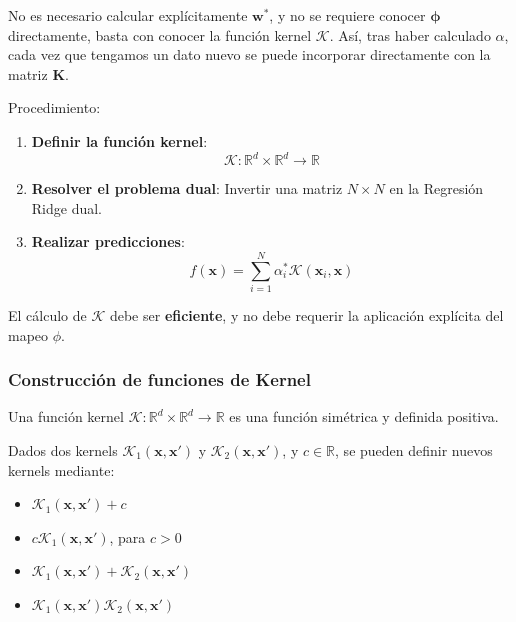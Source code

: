 No es necesario calcular explícitamente $\mathbf{w}^*$, y no se requiere conocer $\boldsymbol{\phi}$ directamente, basta con conocer la función kernel $\mathcal{K}$. Así, tras haber calculado $\alpha$, cada vez que tengamos un dato nuevo se puede incorporar directamente con la matriz \textbf{K}.

Procedimiento:
\begin{enumerate}
    \item \textbf{Definir la función kernel}:
    $$\mathcal{K} : \mathbb{R}^d \times \mathbb{R}^d \to \mathbb{R}$$
    
    \item \textbf{Resolver el problema dual}:
    Invertir una matriz $N \times N$ en la Regresión Ridge dual.
    
    \item \textbf{Realizar predicciones}:
    $$f(\mathbf{x}) = \sum_{i=1}^{N} \alpha_i^* \mathcal{K}(\mathbf{x}_i, \mathbf{x})$$
    \end{enumerate}

El cálculo de $\mathcal{K}$ debe ser \textbf{eficiente}, y no debe requerir la aplicación explícita del mapeo $\phi$.

\subsubsection{Construcción de funciones de Kernel}
Una función kernel $\mathcal{K} : \mathbb{R}^d \times \mathbb{R}^d \to \mathbb{R}$ es una función simétrica y definida positiva.

Dados dos kernels $\mathcal{K}_1(\mathbf{x}, \mathbf{x}')$ y $\mathcal{K}_2(\mathbf{x}, \mathbf{x}')$, y $c \in \mathbb{R}$, se pueden definir nuevos kernels mediante:
\begin{itemize}
    \item $\mathcal{K}_1(\mathbf{x}, \mathbf{x}') + c$
    \item $c\mathcal{K}_1(\mathbf{x}, \mathbf{x}')$, para $c > 0$
    \item $\mathcal{K}_1(\mathbf{x}, \mathbf{x}') + \mathcal{K}_2(\mathbf{x}, \mathbf{x}')$
    \item $\mathcal{K}_1(\mathbf{x}, \mathbf{x}')\mathcal{K}_2(\mathbf{x}, \mathbf{x}')$
\end{itemize}

